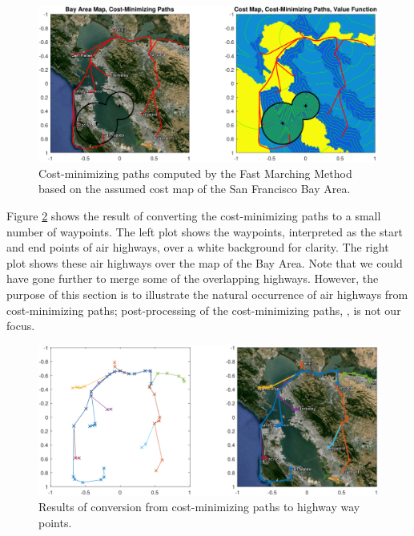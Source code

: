 \begin{figure}
	\centering
	\includegraphics[width=\columnwidth]{"fig/airHighway_results"}
	\caption{Cost-minimizing paths computed by the Fast Marching Method based on the assumed cost map of the San Francisco Bay Area.}
	\label{fig:airHighway_results}
\end{figure}

Figure \ref{fig:airHighway_sparse} shows the result of converting the cost-minimizing paths to a small number of waypoints. The left plot shows the waypoints, interpreted as the start and end points of air highways, over a white background for clarity. The right plot shows these air highways over the map of the Bay Area. Note that we could have gone further to merge some of the overlapping highways. However, the purpose of this section is to illustrate the natural occurrence of air highways from cost-minimizing paths; post-processing of the cost-minimizing paths, , is not our focus. 

\begin{figure}
	\centering
	\includegraphics[width=\columnwidth]{"fig/airHighway_sparse"}
	\caption{Results of conversion from cost-minimizing paths to highway way points.}
	\label{fig:airHighway_sparse}
\end{figure}

